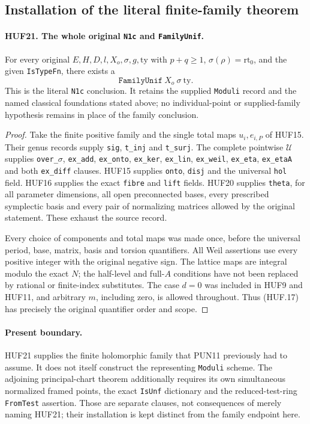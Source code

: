 \subsection{Installation of the literal finite-family theorem}

\paragraph{HUF21. The whole original \texttt{N1c} and \texttt{FamilyUnif}.}
\label{claim:HUF21}
For every original \(E,H,D,l,X_o,\sigma,g,\mathrm{ty}\)
with \(p+q\geq1\), \(\sigma(\rho)=\mathrm{rt}_0\),
and the given \texttt{IsTypeFn}, there exists a
\[
                       \texttt{FamilyUnif}\ X_o\ \sigma\ \mathrm{ty}.
 \tag{HUF.17}
\]
This is the literal \texttt{N1c} conclusion.
It retains the supplied \texttt{Moduli} record
and the named classical foundations stated above;
no individual-point or supplied-family hypothesis
remains in place of the family conclusion.

\begin{proof}
Take the finite positive family and the single
total maps \(u_i,e_{i,P}\) of HUF15.
Their genus records supply \texttt{sig},
\texttt{t\_inj} and \texttt{t\_surj}.
The complete pointwise \(\mathcal U\) supplies
\texttt{over\_\(\sigma\)}, \texttt{ex\_add},
\texttt{ex\_onto}, \texttt{ex\_ker},
\texttt{ex\_lin}, \texttt{ex\_weil},
\texttt{ex\_eta}, \texttt{ex\_etaA}
and both \texttt{ex\_diff} clauses.
HUF15 supplies \texttt{onto}, \texttt{disj}
and the universal \texttt{hol} field.
HUF16 supplies the exact \texttt{fibre}
and \texttt{lift} fields.
HUF20 supplies \texttt{theta}, for all
parameter dimensions, all open preconnected
bases, every prescribed symplectic basis
and every pair of normalizing matrices
allowed by the original statement.
These exhaust the source record.

Every choice of components and total maps
was made once, before the universal
period, base, matrix, basis and torsion
quantifiers.  All Weil assertions use
every positive integer with the original
negative sign.  The lattice maps are
integral modulo the exact \(N\);
the half-level and full-\(A\) conditions
have not been replaced by rational
or finite-index substitutes.
The case \(d=0\) was included in HUF9
and HUF11, and arbitrary \(m\), including
zero, is allowed throughout.
Thus (HUF.17) has precisely the original
quantifier order and scope.
\end{proof}

\paragraph{Present boundary.}
HUF21 supplies the finite holomorphic family
that PUN11 previously had to assume.
It does not itself construct the representing
\texttt{Moduli} scheme.
The adjoining principal-chart theorem additionally
requires its own simultaneous normalized framed
points, the exact \texttt{IsUnf} dictionary and
the reduced-test-ring \texttt{FromTest} assertion.
Those are separate clauses, not consequences
of merely naming HUF21; their installation is
kept distinct from the family endpoint here.
